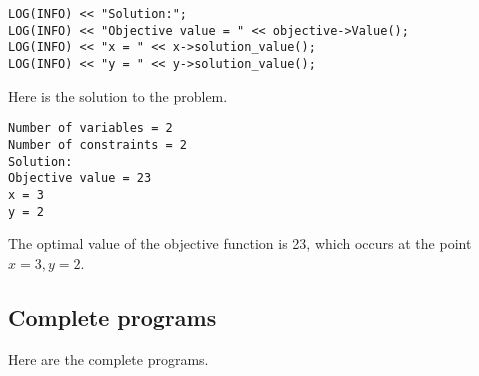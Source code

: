 \documentclass[a4paper,12pt,notitlepage,twoside,openright]{article}
\begin{document}
\begin{verbatim}
LOG(INFO) << "Solution:";
LOG(INFO) << "Objective value = " << objective->Value();
LOG(INFO) << "x = " << x->solution_value();
LOG(INFO) << "y = " << y->solution_value();
\end{verbatim}

Here is the solution to the problem.

\begin{verbatim}
Number of variables = 2
Number of constraints = 2
Solution:
Objective value = 23
x = 3
y = 2
\end{verbatim}

The optimal value of the objective function is 23, which occurs at the point \(x = 3, y = 2\).

\subsection{Complete programs}

Here are the complete programs.
\end{document}
